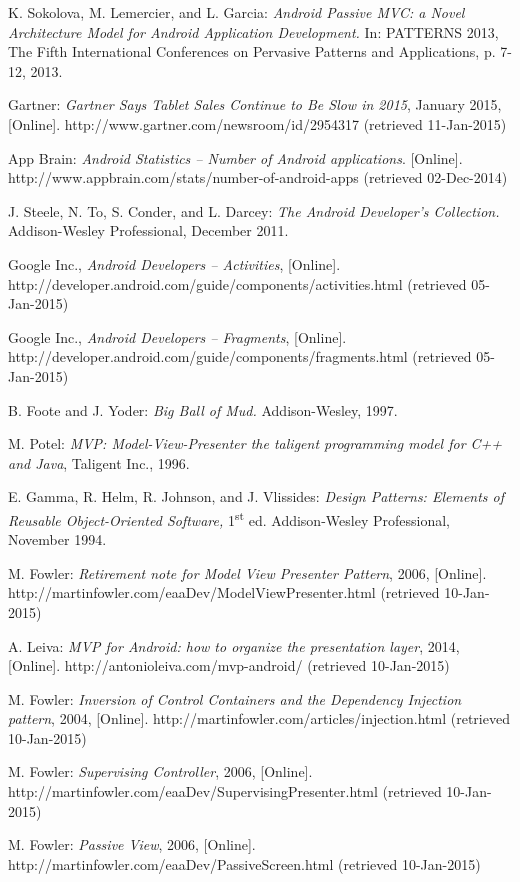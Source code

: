 \begin{thebibliography}{1}

K. Sokolova, M. Lemercier, and L. Garcia: \emph{Android Passive MVC: a Novel Architecture Model for Android Application Development.} In: PATTERNS 2013, The Fifth International Conferences on Pervasive Patterns and Applications, p. 7-12, 2013.

Gartner: \emph{Gartner Says Tablet Sales Continue to Be Slow in 2015}, January 2015, 
[Online]. http://www.gartner.com/newsroom/id/2954317 (retrieved 11-Jan-2015)

App Brain: \emph{Android Statistics -- Number of Android applications}. 
[Online]. http://www.appbrain.com/stats/number-of-android-apps (retrieved 02-Dec-2014)

J. Steele, N. To, S. Conder, and L. Darcey: \emph{The Android Developer's Collection.} Addison-Wesley Professional, December 2011.

Google Inc., \emph{Android Developers -- Activities},
[Online]. http://developer.android.com/guide/components/activities.html (retrieved 05-Jan-2015)

Google Inc., \emph{Android Developers -- Fragments},
[Online]. http://developer.android.com/guide/components/fragments.html (retrieved 05-Jan-2015)

B. Foote and J. Yoder: \emph{Big Ball of Mud.} Addison-Wesley, 1997.

M. Potel: \emph{MVP: Model-View-Presenter the taligent programming model for C++ and Java}, Taligent Inc., 1996.

E. Gamma, R. Helm, R. Johnson, and J. Vlissides: \emph{Design Patterns: Elements of Reusable Object-Oriented Software,} 1\textsuperscript{st} ed. Addison-Wesley Professional, November 1994.

M. Fowler: \emph{Retirement note for Model View Presenter Pattern}, 2006, 
[Online]. http://martinfowler.com/eaaDev/ModelViewPresenter.html (retrieved 10-Jan-2015)

A. Leiva: \emph{MVP for Android: how to organize the presentation layer}, 2014, 
[Online]. http://antonioleiva.com/mvp-android/ (retrieved 10-Jan-2015)

M. Fowler: \emph{Inversion of Control Containers and the Dependency Injection pattern}, 2004, 
[Online]. http://martinfowler.com/articles/injection.html (retrieved 10-Jan-2015)

M. Fowler: \emph{Supervising Controller}, 2006, 
[Online]. http://martinfowler.com/eaaDev/SupervisingPresenter.html (retrieved 10-Jan-2015)

M. Fowler: \emph{Passive View}, 2006, 
[Online]. http://martinfowler.com/eaaDev/PassiveScreen.html (retrieved 10-Jan-2015)

\end{thebibliography}